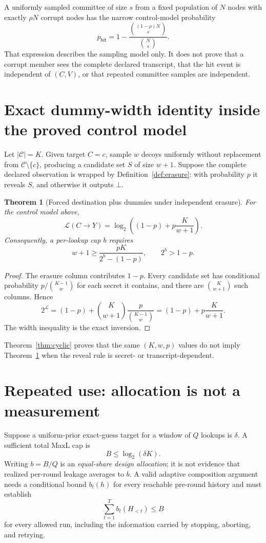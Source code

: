 \documentclass[11pt]{article}
\newcommand{\MaxL}{\mathcal{L}}
\newcommand{\logtwo}{\log_2}
\newcommand{\C}{\mathcal{C}} %
\newtheorem{theorem}{Theorem}
\begin{document}
A uniformly sampled committee of size \(s\) from a fixed population of \(N\) nodes with exactly \(\rho N\) corrupt nodes has the narrow control-model probability
\[
p_{\mathsf{hit}}
=1-\frac{\binom{(1-\rho)N}{s}}{\binom{N}{s}}.
\]
That expression describes the sampling model only. It does not prove that a corrupt member sees the complete declared transcript, that the hit event is independent of \((C,V)\), or that repeated committee samples are independent.

\section{Exact dummy-width identity inside the proved control model}\label{sec:control}
Let \(|\C|=K\). Given target \(C=c\), sample \(w\) decoys uniformly without replacement from \(\C\setminus\{c\}\), producing a candidate set \(S\) of size \(w+1\). Suppose the complete declared observation is wrapped by Definition~\ref{def:erasure}: with probability \(p\) it reveals \(S\), and otherwise it outputs \(\bot\).

\begin{theorem}[Forced destination plus dummies under independent erasure]\label{thm:forced}
For the control model above,
\[
\MaxL(C\to Y)
=\logtwo\!\left((1-p)+p\frac{K}{w+1}\right).
\]
Consequently, a per-lookup cap \(b\) requires
\[
w+1\ge \frac{pK}{2^b-(1-p)},
\qquad 2^b>1-p.
\]
\end{theorem}

\begin{proof}
The erasure column contributes \(1-p\). Every candidate set has conditional probability \(p/\binom{K-1}{w}\) for each secret it contains, and there are \(\binom{K}{w+1}\) such columns. Hence
\[
2^{\MaxL}
=(1-p)+\binom{K}{w+1}\frac{p}{\binom{K-1}{w}}
=(1-p)+p\frac{K}{w+1}.
\]
The width inequality is the exact inversion.
\end{proof}

Theorem~\ref{thm:cyclic} proves that the same \((K,w,p)\) values do not imply Theorem~\ref{thm:forced} when the reveal rule is secret- or transcript-dependent.

\section{Repeated use: allocation is not a measurement}\label{sec:repetition}
Suppose a uniform-prior exact-guess target for a window of \(Q\) lookups is \(\delta\). A sufficient total MaxL cap is
\[
B\le\logtwo(\delta K).
\]
Writing \(b=B/Q\) is an \emph{equal-share design allocation}; it is not evidence that realized per-round leakage averages to \(b\). A valid adaptive composition argument needs a conditional bound \(b_t(h)\) for every reachable pre-round history and must establish
\[
\sum_{t=1}^{T}b_t(H_{<t})\le B
\]
for every allowed run, including the information carried by stopping, aborting, and retrying.
\end{document}
